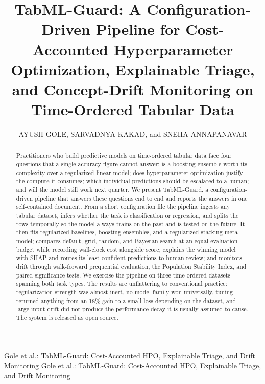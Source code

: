 \documentclass{ieeeaccess}
\providecommand{\headeretal}{et al.}
\begin{document}

\title{TabML-Guard: A Configuration-Driven Pipeline for Cost-Accounted Hyperparameter Optimization, Explainable Triage, and Concept-Drift Monitoring on Time-Ordered Tabular Data}

\author{\uppercase{Ayush Gole}, \uppercase{Sarvadnya Kakad}, and \uppercase{Sneha Annapanavar}}
\address[1]{Department of Computer Engineering, Vidyalankar Institute of Technology, Mumbai, India (e-mail: ayushgole1910@gmail.com, sarvadnya.kakad@vit.edu.in)}
\address[2]{Faculty, Department of Computer Engineering, Vidyalankar Institute of Technology, Mumbai, India (e-mail: sneha.annapanavar@vit.edu.in)}

\markboth
{Gole \headeretal: TabML-Guard: Cost-Accounted HPO, Explainable Triage, and Drift Monitoring}
{Gole \headeretal: TabML-Guard: Cost-Accounted HPO, Explainable Triage, and Drift Monitoring}


\begin{abstract}
Practitioners who build predictive models on time-ordered tabular data face four questions that a single accuracy figure cannot answer: is a boosting ensemble worth its complexity over a regularized linear model; does hyperparameter optimization justify the compute it consumes; which individual predictions should be escalated to a human; and will the model still work next quarter. We present TabML-Guard, a configuration-driven pipeline that answers these questions end to end and reports the answers in one self-contained document. From a short configuration file the pipeline ingests any tabular dataset, infers whether the task is classification or regression, and splits the rows temporally so the model always trains on the past and is tested on the future. It then fits regularized baselines, boosting ensembles, and a regularized stacking meta-model; compares default, grid, random, and Bayesian search at an equal evaluation budget while recording wall-clock cost alongside score; explains the winning model with SHAP and routes its least-confident predictions to human review; and monitors drift through walk-forward prequential evaluation, the Population Stability Index, and paired significance tests. We exercise the pipeline on three time-ordered datasets spanning both task types. The results are unflattering to conventional practice: regularization strength was almost inert, no model family won universally, tuning returned anything from an 18\% gain to a small loss depending on the dataset, and large input drift did not produce the performance decay it is usually assumed to cause. The system is released as open source.
\end{abstract}
\end{document}
